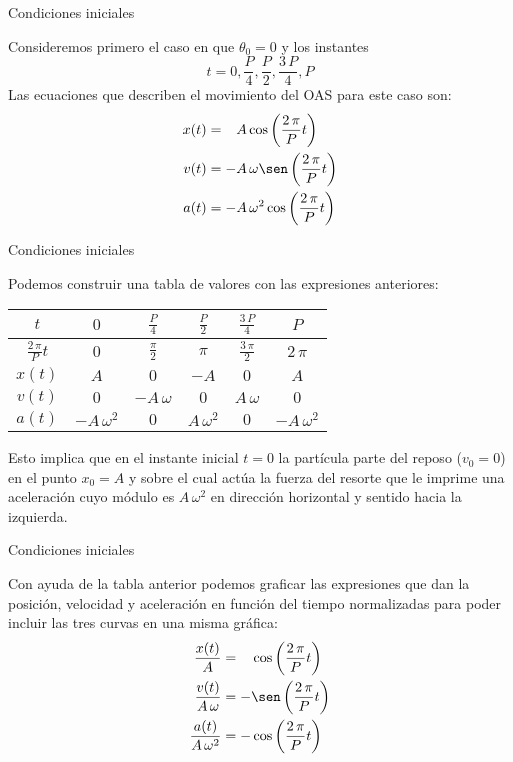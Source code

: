 \documentclass[11pt,handout,aspectratio=1610]{beamer}
\begin{document}
\begin{frame}{Condiciones iniciales}

    Consideremos primero el caso en que $\theta_0 = 0$ y los instantes $$t = 0, \frac{P}{4}, \frac{P}{2}, \frac{3\, P}{4}, P$$ Las ecuaciones que describen el movimiento del OAS para este caso son:
    \begin{align*}
        x (t) &= \phantom{+} A \cos \left(\frac{2 \, \pi}{P} t \right) \\
        v (t) &= - A \, \omega \sen \left(\frac{2 \, \pi}{P} t \right) \\
        a (t) &= - A \, \omega^2 \cos \left(\frac{2 \, \pi}{P} t \right)
    \end{align*}
    
\end{frame}

\begin{frame}{Condiciones iniciales}

    Podemos construir una tabla de valores con las expresiones anteriores:
    \begin{center}
        \begin{tabular}{|c|c|c|c|c|c|}
            \hline
            $t$    & $0$ & $\frac{P}{4}$ & $\frac{P}{2}$ & $\frac{3\, P}{4}$ & $P$ \\ \hline
            $\frac{2 \, \pi}{P} t$ & $0$ & $\frac{\pi}{2}$ & $\pi$ & $\frac{3 \,\pi}{2}$ & $2 \, \pi$ \\ \hline
            $x(t)$ & $A$ & $0$ & $-A$ & $0$ & $A$ \\ \hline
            $v(t)$ & $0$ & $- A \, \omega$ & $0$ & $A \, \omega$ & $0$ \\ \hline
            $a(t)$ & $- A \, \omega^2$ & $0$ & $A \, \omega^2$ & $0$ & $- A \, \omega^2$ \\ \hline
        \end{tabular}
    \end{center}

    Esto implica que en el instante inicial $t=0$ la partícula parte del reposo ($v_0 = 0$) en el punto $x_0 = A$ y sobre el cual actúa la fuerza del resorte que le imprime una aceleración cuyo módulo es $A \, \omega^2$ en dirección horizontal y sentido hacia la izquierda.

\end{frame}

\begin{frame}{Condiciones iniciales}

    Con ayuda de la tabla anterior podemos graficar las expresiones que dan la posición, velocidad y aceleración en función del tiempo normalizadas para poder incluir las tres curvas en una misma gráfica:
    \begin{align*}
        \frac{x (t)}{A} &= \phantom{+} \cos \left(\frac{2 \, \pi}{P} t \right) \\
        \frac{v (t)}{A \, \omega} &= - \sen \left(\frac{2 \, \pi}{P} t \right) \\
        \frac{a (t)}{A \, \omega^2} &= - \cos \left(\frac{2 \, \pi}{P} t \right)
    \end{align*}
    
\end{frame}
\end{document}
